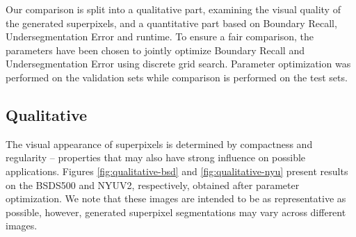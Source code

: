 \documentclass[runningheads]{llncs}
\begin{document}
    Our comparison is split into a qualitative part, examining the visual quality of the generated superpixels, and a quantitative part based on Boundary Recall, Undersegmentation Error and runtime.
    To ensure a fair comparison, the parameters have been chosen to jointly optimize Boundary Recall and Undersegmentation Error using discrete grid search.
    Parameter optimization was performed on the validation sets while comparison is performed on the test sets.
    
    
    \vspace{-1.5mm}
    \subsection{Qualitative}
    \vspace{-0.5mm}
    \label{subsec:qualitative}

    The visual appearance of superpixels is determined by compactness and regularity
    -- properties that may also have strong influence on possible applications.
    Figures \ref{fig:qualitative-bsd} and \ref{fig:qualitative-nyu} present results on the BSDS500 and NYUV2, respectively, obtained after parameter optimization.
    We note that these images are intended to be as representative as possible, however, generated superpixel segmentations may vary across different images.
    
\end{document}
